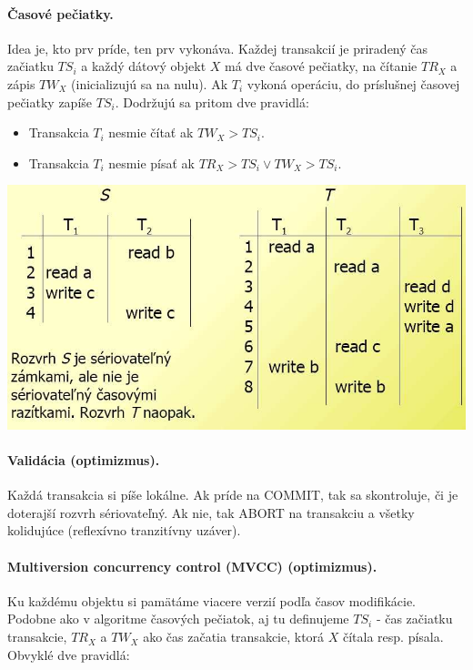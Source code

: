 \documentclass[10pt,a4paper]{article}
\begin{document}
\paragraph{Časové pečiatky.}
Idea je, kto prv príde, ten prv vykonáva. 
Každej transakcií je priradený čas začiatku $TS_i$ a každý dátový objekt $X$ má dve časové pečiatky, na čítanie $TR_X$ a zápis $TW_X$ (inicializujú sa na nulu). Ak $T_i$ vykoná operáciu, do príslušnej časovej pečiatky zapíše $TS_i$. Dodržujú sa pritom dve pravidlá: 
\begin{itemize}
\item Transakcia $T_i$ nesmie čítať ak $TW_X > TS_i$.
\item Transakcia $T_i$ nesmie písať ak $TR_X > TS_i \vee TW_X > TS_i$.
\end{itemize}

\begin{center}
\includegraphics[scale=0.5]{db_lock_ts.png}
\end{center}

\paragraph{Validácia (optimizmus).}
Každá transakcia si píše lokálne. Ak príde na COMMIT, tak sa skontroluje, či je doterajší rozvrh sériovateľný. Ak nie, tak ABORT na transakciu a všetky kolidujúce (reflexívno tranzitívny uzáver). 

\paragraph{Multiversion concurrency control (MVCC) (optimizmus).}
Ku každému objektu si pamätáme viacere verzií podľa časov modifikácie.
Podobne ako v algoritme časových pečiatok, aj tu definujeme $TS_i$ - čas začiatku transakcie, $TR_X$ a $TW_X$ ako čas začatia transakcie, ktorá $X$ čítala resp. písala. Obvyklé dve pravidlá: 
\end{document}

